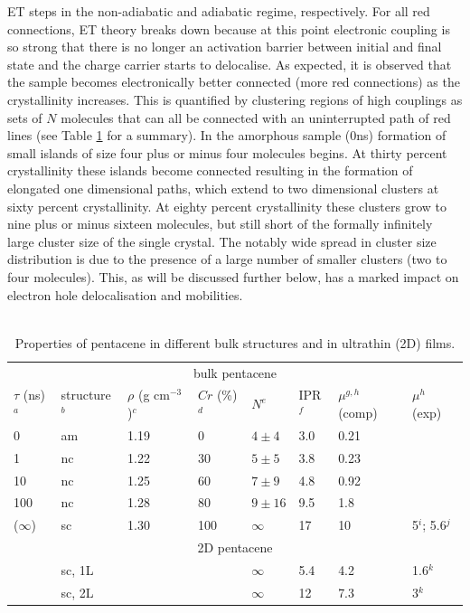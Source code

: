 ET steps in the non-adiabatic and adiabatic regime, respectively. For all red connections, ET theory breaks down because at this point electronic coupling is so strong 
that there is no longer an activation barrier between initial and final state and the charge carrier starts to delocalise\cite{C6FD00107F}. As expected, it is observed that  
the sample becomes electronically better connected (more red connections) as the crystallinity increases.  
This is quantified by clustering regions of high couplings as sets of $N$ molecules that can all be connected with an uninterrupted path of red lines (see Table \ref{tab:fragments} for a summary).
In the amorphous sample (0ns) formation of small islands of size four plus or minus four molecules begins. At thirty percent crystallinity these islands become connected resulting in the formation of 
elongated one dimensional paths, which extend to two dimensional clusters at sixty percent crystallinity. At eighty percent crystallinity these clusters grow to {nine plus or minus sixteen} molecules, but still short of the formally infinitely 
large cluster size of the single crystal. The notably wide spread in cluster size distribution is due to the presence of a large number of smaller clusters (two to four molecules). 
This, as will be discussed further below, has a marked impact on electron hole delocalisation and mobilities. \\
\\
\begin{table}
 \caption{\label{tab:fragments}Properties of pentacene in different bulk structures and in ultrathin (2D) films.}
\begin{center}
  \begin{tabular}[htbp]{@{}llllllll@{}}
    \hline
     \multicolumn{8}{c}{bulk pentacene} \\
    $\tau$ (ns)$^a$ & structure$^b$ & $\rho$ (g cm$^{-3}$)$^c$ &  $Cr$ (\%)$^d$  &  $N^e$   & IPR$^f$  & $\mu^{g,h}$ (comp) & $\mu^h$ (exp) \\
    \hline
    0       & am & 1.19   & 0     & $4\pm4$      & 3.0 & 0.21 &       \\
    1       & nc & 1.22   & 30   & $5\pm5$      & 3.8	 & 0.23 &       \\
    10     & nc & 1.25   & 60   & $7\pm9$    & 4.8 & 0.92   &        \\
    100   & nc & 1.28  & 80   & $9\pm16$  & 9.5 & 1.8   &        \\
 ($\infty$) & sc &  1.30  & 100 & $\infty$           & 17 & 10 & 5$^i$; 5.6$^j$ \\
    \hline
    \multicolumn{8}{c}{2D pentacene} \\
             & sc, 1L &        &      &  $\infty$ &       5.4   &  4.2 & 1.6$^k$\\
             & sc, 2L &        &     &  $\infty$ &         12 & 7.3 & 3$^k$ \\
    \hline
  \end{tabular}
\end{center}
\end{table}
